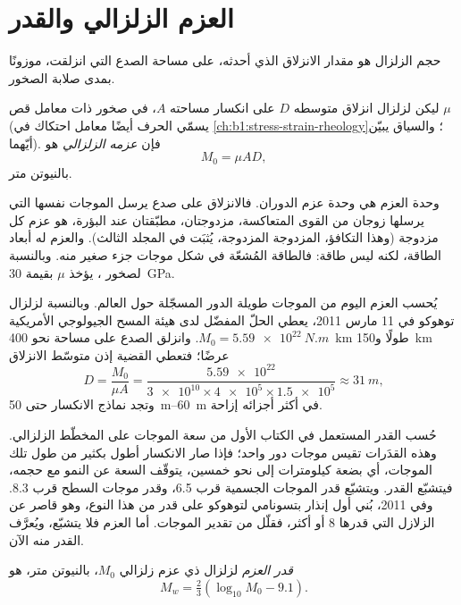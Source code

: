 \section{العزم الزلزالي والقدر}\label{sec:b1:earthquake-source:moment}

حجم الزلزال هو مقدار الانزلاق الذي أحدثه، على مساحة الصدع التي انزلقت، موزونًا بمدى صلابة الصخور.

\begin{definition}\label{def:b1:earthquake-source:moment}
ليكن لزلزال انزلاق متوسطه $D$ على انكسار مساحته $A$، في صخور ذات معامل قص $\mu$ (يسمّي الحرف أيضًا معامل احتكاك في \cref{ch:b1:stress-strain-rheology}؛ والسياق يبيّن أيّهما). فإن \emph{عزمه الزلزالي} هو
\[
  M_0 = \mu A D ,
\]
بالنيوتن متر.
\end{definition}

وحدة العزم هي وحدة عزم الدوران. فالانزلاق على صدع يرسل الموجات نفسها التي يرسلها زوجان من القوى المتعاكسة، مزدوجتان، مطبّقتان عند البؤرة،  هو عزم كل مزدوجة (وهذا التكافؤ، المزدوجة المزدوجة، يُثبَت في المجلد الثالث). والعزم له أبعاد الطاقة، لكنه ليس طاقة: فالطاقة المُشعّة في شكل موجات جزء صغير منه. وبالنسبة لصخور ، يؤخذ $\mu$ بقيمة \qty{30}{GPa}.

يُحسب العزم اليوم من الموجات طويلة الدور المسجّلة حول العالم. وبالنسبة لزلزال توهوكو في 11 مارس 2011، يعطي الحلّ المفضّل لدى هيئة المسح الجيولوجي الأمريكية $M_0 = \qty{5.59e22}{N.m}$. وانزلق الصدع على مساحة نحو \qty{400}{km} طولًا و\qty{150}{km} عرضًا؛ فتعطي القضية إذن متوسّط الانزلاق
\[
  D = \frac{M_0}{\mu A}
    = \frac{\num{5.59e22}}{\num{3e10}\times\num{4e5}\times\num{1.5e5}}
    \approx \qty{31}{m} ,
\]
وتجد نماذج الانكسار حتى \qtyrange{50}{60}{m} في أكثر أجزائه إزاحة.

حُسب القدر المستعمل في الكتاب الأول من سعة الموجات على المخطّط الزلزالي. وهذه القدَرات تقيس موجات دور واحد؛ فإذا صار الانكسار أطول بكثير من طول تلك الموجات، أي بضعة كيلومترات إلى نحو خمسين، يتوقّف السعة عن النمو مع حجمه، فيتشبّع القدر. ويتشبّع قدر الموجات الجسمية قرب 6.5، وقدر موجات السطح قرب 8.3. وفي 2011، بُني أول إنذار بتسونامي لتوهوكو على قدر من هذا النوع، وهو قاصر عن الزلازل التي قدرها 8 أو أكثر، فقلّل من تقدير الموجات. أما العزم فلا يتشبّع، ويُعرَّف القدر منه الآن.

\begin{definition}\label{def:b1:earthquake-source:mw}
\emph{قدر العزم} لزلزال ذي عزم زلزالي $M_0$، بالنيوتن متر، هو
\[
  M_w = \tfrac23\left(\log_{10} M_0 - 9.1\right) .
\]
\end{definition}

